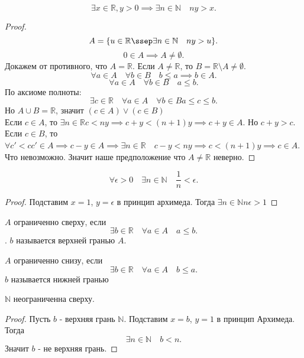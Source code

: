 \documentclass[11pt, oneside]{article}   	%
\begin{document}
\begin{theorem}
    \[ \exists{x \in \mathbb{R}, y > 0} \implies \exists{n \in \mathbb{N}}\quad ny>x .\]
    \begin{proof}
        \[ A = \{u \in \mathbb{R}\ssep \exists{n \in \mathbb{N}}\quad ny>u \}  .\]
        \[ 0 \in A \implies A \neq  \emptyset .\]
        Докажем от противного, что $A = \mathbb{R}$.
        Если $A \neq \mathbb{R}$, то $B = \mathbb{R}\setminus A \neq \emptyset$.
        \[ \forall{a \in A}\quad \forall{b \in B} \quad b\le a \implies b \in A .\] 
        \[ \forall{a \in A}\quad \forall{b \in B}\quad a\le b .\]
        По аксиоме полноты:
        \[ \exists{c \in \mathbb{R}}\quad \forall{a \in A}\quad \forall{b \in B} a \le c \le b .\]
        Но $A\cup B = \mathbb{R}$, значит $\left( c \in A  \right)\lor\left( c \in B \right)  $\\ 
        Если $c \in A$, то $\exists{n \in \mathbb{R}} c<ny \implies c+y< (n+1)y \implies c+y \in A$. Но $c+y>c$.\\
        Если  $c \in B$, то $\forall{c'<c } c' \in A \implies c-y \in A \implies \exists{n \in \mathbb{R}}\quad c-y < ny \implies c<(n+1)y \implies c \in A$. Что невозможно. Значит наше предположение что  $A \neq \mathbb{R}$ неверно.
    \end{proof}
    \end{theorem}
    \begin{tlemma}
        \[ \forall{\epsilon > 0}\quad \exists{n \in \mathbb{N}}\quad \frac{1}{n}<\epsilon  .\]
        \begin{proof}
            Подставим $x=1$,  $y=\epsilon$ в принцип архимеда. Тогда  $\exists{n \in \mathbb{N}} n\epsilon > 1$
        \end{proof}
    \end{tlemma}
    \begin{definition}
        $A$ ограниченно сверху, если 
        \[ \exists{b \in \mathbb{R}}\quad \forall{a \in A}\quad a\le b  .\].
        $b$ называется верхней гранью  $A$.
    \end{definition}
    \begin{definition}
        $A$ ограниченно снизу, если 
        \[ \exists{b \in \mathbb{R}}\quad \forall{a \in A}\quad b\le a .\]
        $b$ называется нижней гранью
    \end{definition}
    \begin{tlemma}
        $\mathbb{N}$ неограниченна сверху.\\
        \begin{proof}
            Пусть $b$ - верхняя грань  $\mathbb{N}$. Подставим $x=b$,  $y=1$ в принцип Архимеда. Тогда 
            \[ \exists{n \in \mathbb{N}}\quad b<n .\]
            Значит $b$ -  не верхняя грань.
        \end{proof}
    \end{tlemma}
\end{document}
